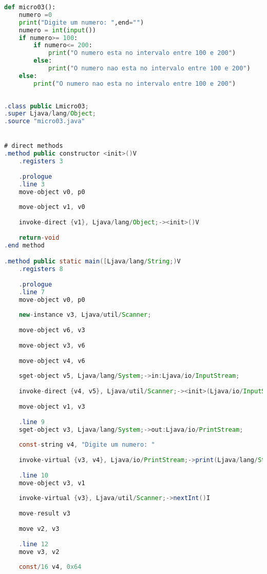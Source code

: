 \documentclass[hidelinks,12pt]{article}
\begin{document}
	\begin{lstlisting}[caption=Código em python,language=Python]
def micro03():
	numero =0
	print("Digite um numero: ",end="")
	numero = int(input())
	if numero>= 100:
		if numero<= 200:
			print("O numero esta no intervalo entre 100 e 200")
		else:
			print("O numero nao esta no intervalo entre 100 e 200")
	else:
		print("O numero nao esta no intervalo entre 100 e 200")	
	
	\end{lstlisting}
	
	\begin{lstlisting}[caption=Smali resultante do .java,language=java]
.class public Lmicro03;
.super Ljava/lang/Object;
.source "micro03.java"


# direct methods
.method public constructor <init>()V
	.registers 3
	
	.prologue
	.line 3
	move-object v0, p0
	
	move-object v1, v0
	
	invoke-direct {v1}, Ljava/lang/Object;-><init>()V
	
	return-void
.end method

.method public static main([Ljava/lang/String;)V
	.registers 8
	
	.prologue
	.line 7
	move-object v0, p0
	
	new-instance v3, Ljava/util/Scanner;
	
	move-object v6, v3
	
	move-object v3, v6
	
	move-object v4, v6
	
	sget-object v5, Ljava/lang/System;->in:Ljava/io/InputStream;
	
	invoke-direct {v4, v5}, Ljava/util/Scanner;-><init>(Ljava/io/InputStream;)V
	
	move-object v1, v3
	
	.line 9
	sget-object v3, Ljava/lang/System;->out:Ljava/io/PrintStream;
	
	const-string v4, "Digite um numero: "
	
	invoke-virtual {v3, v4}, Ljava/io/PrintStream;->print(Ljava/lang/String;)V
	
	.line 10
	move-object v3, v1
	
	invoke-virtual {v3}, Ljava/util/Scanner;->nextInt()I
	
	move-result v3
	
	move v2, v3
	
	.line 12
	move v3, v2
	
	const/16 v4, 0x64
	

\end{lstlisting}
\end{document}
